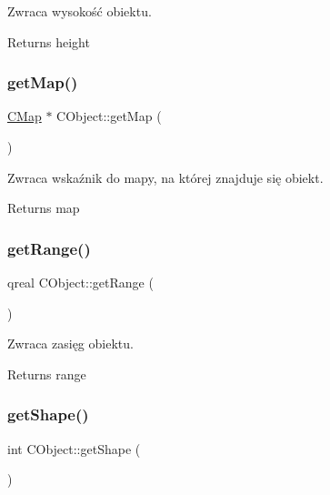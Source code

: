 Zwraca wysokość obiektu. 

\begin{DoxyReturn}{Returns}
height 
\end{DoxyReturn}
\mbox{\label{class_c_object_a57ea53dbd6d12a6da554f24d7b6c0d5d}} 
\subsubsection{\texorpdfstring{get\+Map()}{getMap()}}
{\footnotesize\ttfamily \mbox{\hyperlink{class_c_map}{C\+Map}} $\ast$ C\+Object\+::get\+Map (\begin{DoxyParamCaption}{ }\end{DoxyParamCaption})}



Zwraca wskaźnik do mapy, na której znajduje się obiekt. 

\begin{DoxyReturn}{Returns}
map 
\end{DoxyReturn}
\mbox{\label{class_c_object_a8d0881ca2211266500a3d4af11cf8824}} 
\subsubsection{\texorpdfstring{get\+Range()}{getRange()}}
{\footnotesize\ttfamily qreal C\+Object\+::get\+Range (\begin{DoxyParamCaption}{ }\end{DoxyParamCaption})}



Zwraca zasięg obiektu. 

\begin{DoxyReturn}{Returns}
range 
\end{DoxyReturn}
\mbox{\label{class_c_object_aca839368d91bd68f3d46288316a86807}} 
\subsubsection{\texorpdfstring{get\+Shape()}{getShape()}}
{\footnotesize\ttfamily int C\+Object\+::get\+Shape (\begin{DoxyParamCaption}{ }\end{DoxyParamCaption})}



